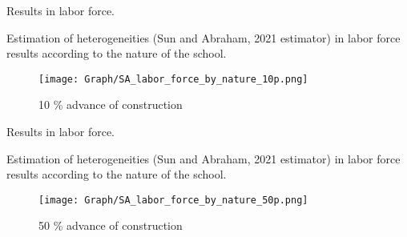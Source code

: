 \documentclass[9pt]{beamer}
\begin{document}
 

\begin{frame}{ Results in labor force. \hyperlink{result_labor}{}  } \label{10p_labor_nat}

Estimation of heterogeneities (Sun and Abraham, 2021 estimator) in labor force results according to the nature of the school.

\begin{figure}
  \centering
  \texttt{[image: Graph/SA\_labor\_force\_by\_nature\_10p.png]} 
  \caption{\small 10 \% advance of construction}
  \label{fig:6.1sub-first}
\end{figure}

\end{frame}                            

\begin{frame}{ Results in labor force. \hyperlink{result_labor}{}  } \label{50p_labor_nat}

Estimation of heterogeneities (Sun and Abraham, 2021 estimator) in labor force results according to the nature of the school.

\begin{figure}
  \centering
  \texttt{[image: Graph/SA\_labor\_force\_by\_nature\_50p.png]} 
  \caption{\small 50 \% advance of construction}
  \label{fig:6.1sub-first}
\end{figure}

\end{frame}   

 
\end{document}
